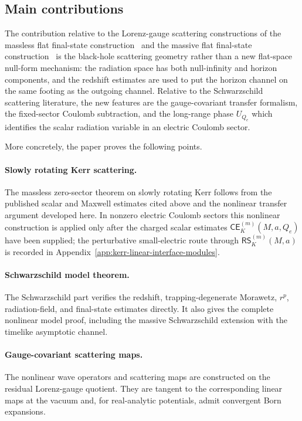 \documentclass[11pt]{article}
\numberwithin{equation}{section}
\theoremstyle{plain}
\theoremstyle{definition}
\theoremstyle{remark}
\newcommand{\CElec}{\mathsf{CE}}
\newcommand{\RSLin}{\mathsf{RS}}
\begin{document}
\subsection{Main contributions}\label{subsec:main-contrib}

The contribution relative to the Lorenz-gauge scattering constructions of the massless flat final-state construction~\cite{HeMKGInfinity} and the massive flat final-state construction~\cite{ChenMassiveMKG} is the black-hole scattering geometry rather than a new flat-space null-form mechanism: the radiation space has both null-infinity and horizon components, and the redshift estimates are used to put the horizon channel on the same footing as the outgoing channel.  Relative to the Schwarzschild scattering literature, the new features are the gauge-covariant transfer formalism, the fixed-sector Coulomb subtraction, and the long-range phase \(U_{Q_e}\) which identifies the scalar radiation variable in an electric Coulomb sector.

More concretely, the paper proves the following points.

\paragraph{Slowly rotating Kerr scattering.}
The massless zero-sector theorem on slowly rotating Kerr follows from the published scalar and Maxwell estimates cited above and the nonlinear transfer argument developed here.  In nonzero electric Coulomb sectors this nonlinear construction is applied only after the charged scalar estimates \(\CElec^{(m)}_K(M,a,Q_e)\) have been supplied; the perturbative small-electric route through \(\RSLin^{(m)}_K(M,a)\) is recorded in Appendix~\ref{app:kerr-linear-interface-modules}.

\paragraph{Schwarzschild model theorem.}
The Schwarzschild part verifies the redshift, trapping-degenerate Morawetz, \(r^p\), radiation-field, and final-state estimates directly.  It also gives the complete nonlinear model proof, including the massive Schwarzschild extension with the timelike asymptotic channel.

\paragraph{Gauge-covariant scattering maps.}
The nonlinear wave operators and scattering maps are constructed on the residual Lorenz-gauge quotient.  They are tangent to the corresponding linear maps at the vacuum and, for real-analytic potentials, admit convergent Born expansions.
\end{document}

